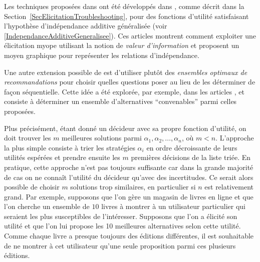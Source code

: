 \documentclass[a4paper,11pt]{article}
\theoremstyle{plain}
\begin{document}
Les techniques proposées dans \cite{chajewska_making_2000, boutilier_pomdp_2002} ont été développés dans \cite{braziunas_local_2005, Braziunas_2008}, comme décrit dans la Section~\ref{SecElicitationTroubleshooting}, pour des fonctions d'utilité satisfaisant l'hypothèse d'indépendance additive généralisée (voir \eqref{IndependanceAdditiveGeneralisee}). Ces articles montrent comment exploiter une élicitation myope utilisant la notion de \emph{valeur d'information} et proposent un moyen graphique pour représenter les relations d'indépendance.

Une autre extension possible de \cite{chajewska_making_2000, boutilier_pomdp_2002} est d'utiliser plutôt des \emph{ensembles optimaux de recommandations} pour choisir quelles questions poser au lieu de les déterminer de façon séquentielle. Cette idée a été explorée, par exemple, dans les articles \cite{price_optimal_2005, viappiani_optimal_2005}, et consiste à déterminer un ensemble d'alternatives ``convenables'' parmi celles proposées.

Plus précisément, étant donné un décideur avec sa propre fonction d'utilité, on doit trouver les $m$ meilleures solutions parmi $\alpha_1, \alpha_2, \dotsc, \alpha_n$, où $m < n$. L'approche la plus simple consiste à trier les stratégies $\alpha_i$ en ordre décroissante de leurs utilités espérées et prendre ensuite les $m$ premières décisions de la liste triée. En pratique, cette approche n'est pas toujours suffisante \cite{price_optimal_2005} car dans la grande majorité de cas on ne connaît l'utilité du décideur qu'avec des incertitudes. Ce serait alors possible de choisir $m$ solutions trop similaires, en particulier si $n$ est relativement grand. Par exemple, supposons que l'on gère un magasin de livres en ligne et que l'on cherche un ensemble de $10$ livres à montrer à un utilisateur particulier qui seraient les plus susceptibles de l'intéresser. Supposons que l'on a élicité son utilité et que l'on lui propose les 10 meilleures alternatives selon cette utilité. Comme chaque livre a presque toujours des éditions différentes, il est souhaitable de ne montrer à cet utilisateur qu'une seule proposition parmi ces plusieurs éditions.
\end{document}
